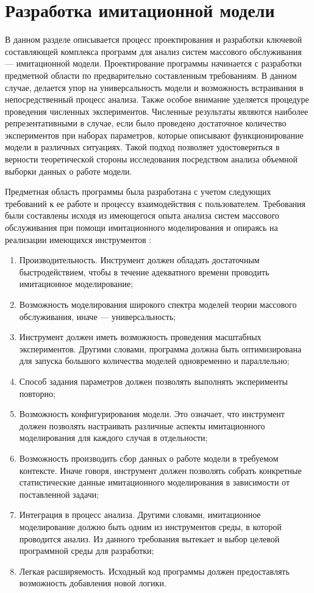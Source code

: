 \section {Разработка имитационной модели}
В данном разделе описывается процесс проектирования и разработки ключевой составляющей комплекса программ для анализ систем массового обслуживания --- имитационной модели. Проектирование программы начинается с разработки предметной области по предварительно составленным требованиям. В данном случае, делается упор на универсальность модели и возможность встраивания в непосредственный	процесс анализа. Также особое внимание уделяется процедуре проведения численных экспериментов. Численные результаты являются наиболее репрезентативными в случае, если было проведено достаточное количество экспериментов при наборах параметров, которые описывают функционирование модели в различных ситуациях. Такой подход позволяет удостовериться в верности теоретической стороны исследования посредством анализа объемной выборки данных о работе модели.

Предметная область программы была разработана с учетом следующих требований к ее работе и процессу взаимодействия с пользователем. Требования были составлены исходя из имеющегося опыта анализа систем массового обслуживания при помощи имитационного моделирования и опираясь на реализации имеющихся инструментов \cite{yakimov2017comparison}:
\begin{enumerate}
	\item Производительность. Инструмент должен обладать достаточным быстродействием, чтобы в течение адекватного времени проводить имитационное моделирование;
	\item Возможность моделирования широкого спектра моделей теории массового обслуживания, иначе --- универсальность;
	\item Инструмент должен иметь возможность проведения масштабных экспериментов. Другими словами, программа должна быть оптимизирована для запуска большого количества моделей одновременно и параллельно;
	\item Способ задания параметров должен позволять выполнять эксперименты повторно;
	\item Возможность конфигурирования модели. Это означает, что инструмент должен позволять настраивать различные аспекты имитационного моделирования для каждого случая в отдельности;
	\item Возможность производить сбор данных о работе модели в требуемом контексте. Иначе говоря, инструмент должен позволять собрать конкретные статистические данные имитационного моделирования в зависимости от поставленной задачи;
	\item Интеграция в процесс анализа. Другими словами, имитационное моделирование должно быть одним из инструментов среды, в которой проводится анализ. Из данного требования вытекает и выбор целевой программной среды для разработки;
	\item Легкая расширяемость. Исходный код программы должен предоставлять возможность добавления новой логики.
\end{enumerate}

